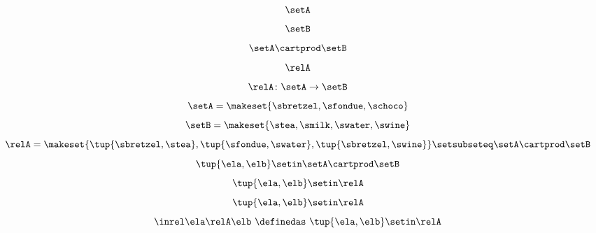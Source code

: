 \begin{forslides}

    \begin{equation}
        \label{eq:slides_session2_rel_72}
        \setA
    \end{equation}
    \begin{equation}
        \label{eq:slides_session2_rel_73}
        \setB
    \end{equation}
    \begin{equation}
        \label{eq:slides_session2_rel_74}
        \setA \cartprod \setB
    \end{equation}
    \begin{equation}
        \label{eq:slides_session2_rel_75}
        \relA
    \end{equation}
    \begin{equation}
        \label{eq:slides_session2_rel_76}
        \relA \colon \setA \to \setB
    \end{equation}
    \begin{equation}
        \label{eq:slides_session2_rel_77}
        \setA = \makeset{ \sbretzel, \sfondue, \schoco }
    \end{equation}
    \begin{equation}
        \label{eq:slides_session2_rel_78}
        \setB = \makeset{ \stea, \smilk, \swater, \swine }
    \end{equation}
    \begin{equation}
        \label{eq:slides_session2_rel_79}
        \relA = \makeset{ \tup{\sbretzel, \stea}, \tup{\sfondue, \swater}, \tup{\sbretzel, \swine} } \setsubseteq \setA \cartprod \setB
    \end{equation}
    \begin{equation}
        \label{eq:slides_session2_rel_80}
        \tup{\ela,\elb} \setin \setA \cartprod \setB
    \end{equation}
    \begin{equation}
        \label{eq:slides_session2_rel_81}
        \tup{\ela,\elb} \setin \relA
    \end{equation}
    \begin{equation}
        \label{eq:slides_session2_rel_82}
        \tup{\ela,\elb}\setin \relA
    \end{equation}
    \begin{equation}
        \label{eq:slides_session2_rel_83}
        \inrel \ela \relA \elb \ \definedas\  \tup{\ela,\elb}\setin \relA
    \end{equation}


\end{forslides}
